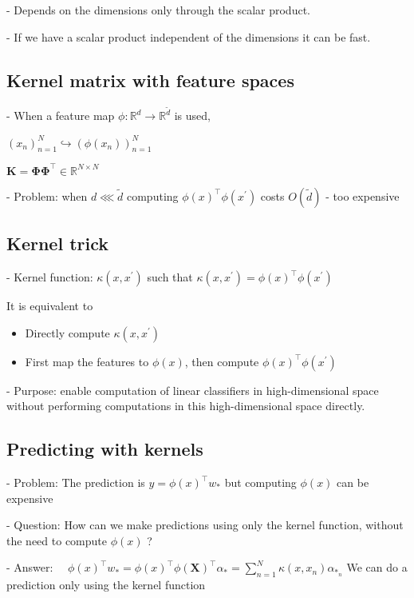 - Depends on the dimensions only through the scalar product.

- If we have a scalar product independent of the dimensions it can be fast.


\subsection*{Kernel matrix with feature spaces}
- When a feature map $\phi: \mathbb{R}^{d} \rightarrow \mathbb{R}^{\tilde{d}}$ is used,

$
\left(x_{n}\right)_{n=1}^{N} \hookrightarrow\left(\phi\left(x_{n}\right)\right)_{n=1}^{N}
$

$
\mathbf{K}=\boldsymbol{\Phi} \boldsymbol{\Phi}^{\top} \in \mathbb{R}^{N \times N}
$

- Problem: when $d \lll \tilde{d}$ computing $\phi(x)^{\top} \phi\left(x^{\prime}\right)$ costs $O(\tilde{d})$ - too expensive

\subsection*{Kernel trick}
- Kernel function: $\kappa\left(x, x^{\prime}\right)$ such that $\kappa(x,x^{\prime})=\phi(x)^\top\phi(x^{\prime})$

It is equivalent to

\begin{itemize}
  \item Directly compute $\kappa\left(x, x^{\prime}\right)$
  \item First map the features to $\phi(x)$, then compute $\phi(x)^{\top} \phi\left(x^{\prime}\right)$
\end{itemize}

- Purpose: enable computation of linear classifiers in high-dimensional space without performing computations in this high-dimensional space directly.

\subsection*{Predicting with kernels}
- Problem: The prediction is $y=\phi(x)^{\top} w_{*}$ but computing $\phi(x)$ can be expensive

- Question: How can we make predictions using only the kernel function, without the need to compute $\phi(x)$ ?

- Answer: $\quad \phi(x)^{\top} w_{*}=\phi(x)^{\top} \phi(\mathbf{X})^{\top} \alpha_{*}=\sum_{n=1}^{N} \kappa\left(x, x_{n}\right) \alpha_{*_{n}}$ We can do a prediction only using the kernel function

